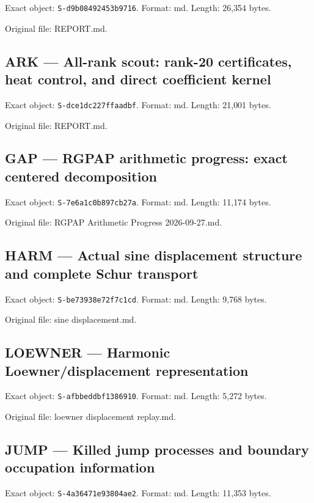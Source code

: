 \documentclass[
  10pt,
  a4paper,
  10pt,
  oneside,
  openany]{book}
\begin{document}
Exact object: \texttt{S-d9b08492453b9716}. Format: md. Length: 26,354
bytes.

Original file: REPORT.md.

\subsection{ARK --- All-rank scout: rank-20 certificates, heat control,
and direct coefficient kernel}\label{source-ark}

Exact object: \texttt{S-dce1dc227ffaadbf}. Format: md. Length: 21,001
bytes.

Original file: REPORT.md.

\subsection{GAP --- RGPAP arithmetic progress: exact centered
decomposition}\label{source-gap}

Exact object: \texttt{S-7e6a1c0b897cb27a}. Format: md. Length: 11,174
bytes.

Original file: RGPAP Arithmetic Progress 2026-09-27.md.

\subsection{HARM --- Actual sine displacement structure and complete
Schur transport}\label{source-harm}

Exact object: \texttt{S-be73938e72f7c1cd}. Format: md. Length: 9,768
bytes.

Original file: sine displacement.md.

\subsection{LOEWNER --- Harmonic Loewner/displacement
representation}\label{source-loewner}

Exact object: \texttt{S-afbbeddbf1386910}. Format: md. Length: 5,272
bytes.

Original file: loewner displacement replay.md.

\subsection{JUMP --- Killed jump processes and boundary occupation
information}\label{source-jump}

Exact object: \texttt{S-4a36471e93804ae2}. Format: md. Length: 11,353
bytes.
\end{document}
